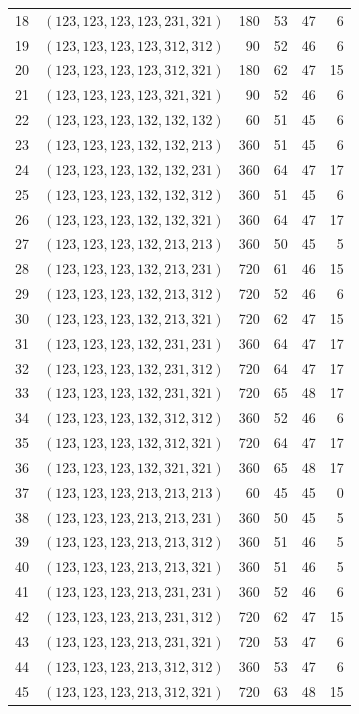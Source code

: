 \documentclass[a4paper,11pt]{amsart}
\numberwithin{equation}{section}
\theoremstyle{definition}
\theoremstyle{remark}
\begin{document}
{\begin{longtable}{@{}rlrrrr@{}}
18 & $(123,123,123,123,231,321)$ & 180 & 53 & 47 & 6\\
19 & $(123,123,123,123,312,312)$ & 90 & 52 & 46 & 6\\
20 & $(123,123,123,123,312,321)$ & 180 & 62 & 47 & 15\\
21 & $(123,123,123,123,321,321)$ & 90 & 52 & 46 & 6\\
22 & $(123,123,123,132,132,132)$ & 60 & 51 & 45 & 6\\
23 & $(123,123,123,132,132,213)$ & 360 & 51 & 45 & 6\\
24 & $(123,123,123,132,132,231)$ & 360 & 64 & 47 & 17\\
25 & $(123,123,123,132,132,312)$ & 360 & 51 & 45 & 6\\
26 & $(123,123,123,132,132,321)$ & 360 & 64 & 47 & 17\\
27 & $(123,123,123,132,213,213)$ & 360 & 50 & 45 & 5\\
28 & $(123,123,123,132,213,231)$ & 720 & 61 & 46 & 15\\
29 & $(123,123,123,132,213,312)$ & 720 & 52 & 46 & 6\\
30 & $(123,123,123,132,213,321)$ & 720 & 62 & 47 & 15\\
31 & $(123,123,123,132,231,231)$ & 360 & 64 & 47 & 17\\
32 & $(123,123,123,132,231,312)$ & 720 & 64 & 47 & 17\\
33 & $(123,123,123,132,231,321)$ & 720 & 65 & 48 & 17\\
34 & $(123,123,123,132,312,312)$ & 360 & 52 & 46 & 6\\
35 & $(123,123,123,132,312,321)$ & 720 & 64 & 47 & 17\\
36 & $(123,123,123,132,321,321)$ & 360 & 65 & 48 & 17\\
37 & $(123,123,123,213,213,213)$ & 60 & 45 & 45 & 0\\
38 & $(123,123,123,213,213,231)$ & 360 & 50 & 45 & 5\\
39 & $(123,123,123,213,213,312)$ & 360 & 51 & 46 & 5\\
40 & $(123,123,123,213,213,321)$ & 360 & 51 & 46 & 5\\
41 & $(123,123,123,213,231,231)$ & 360 & 52 & 46 & 6\\
42 & $(123,123,123,213,231,312)$ & 720 & 62 & 47 & 15\\
43 & $(123,123,123,213,231,321)$ & 720 & 53 & 47 & 6\\
44 & $(123,123,123,213,312,312)$ & 360 & 53 & 47 & 6\\
45 & $(123,123,123,213,312,321)$ & 720 & 63 & 48 & 15\\

\end{longtable}}
\end{document}
